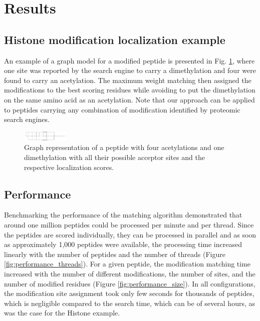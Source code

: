 \documentclass{bioinfo}
\begin{document}



\section{Results}

\subsection{Histone modification localization example}


 An example of a graph model for a modified peptide is presented in Fig. \ref{fig:histone_peptide}, where one site was reported by the search engine to carry a dimethylation and four were found to carry an acetylation. The maximum weight matching then assigned the modifications to the best scoring residues while avoiding to put the dimethylation on the same amino acid as an acetylation. Note that our approach can be applied to peptides carrying any combination of modification identified by proteomic search engines.
 
 \begin{figure}[!tpb]
 	\centerline{\includegraphics[width=0.2\textwidth]{figures/figure_histone.png}}
 	\caption{Graph representation of a peptide with four acetylations and one dimethylation with all their possible acceptor sites and the respective localization scores.}\label{fig:histone_peptide}
 \end{figure}

 

\subsection{Performance}

Benchmarking the performance of the matching algorithm demonstrated that around one million peptides could be processed per minute and per thread. Since the peptides are scored individually, they can be processed in parallel and as soon as approximately 1,000 peptides were available, the processing time increased linearly with the number of peptides and the number of threads (Figure \ref{fig:performance_threads}). For a given peptide, the modification matching time increased with the number of different modifications, the number of sites, and the number of modified residues (Figure \ref{fig:performance_size}). In all configurations, the modification site assignment took only few seconds for thousands of peptides, which is negligible compared to the search time, which can be of several hours, as was the case for the Histone example.
\end{document}
